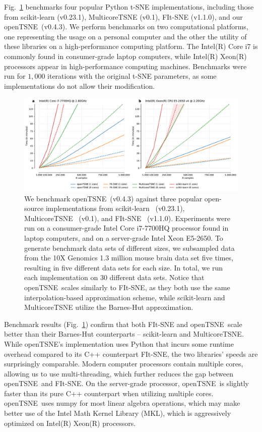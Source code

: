 \documentclass[letter]{article}
\newcommand{\opentsne}{\textsf{openTSNE}}
\begin{document}
Fig.~\ref{fig:benchmarks} benchmarks four popular Python t-SNE implementations,
including those from \textsf{scikit-learn} (v0.23.1), \textsf{MulticoreTSNE}
(v0.1), \textsf{FIt-SNE} (v1.1.0), and our \opentsne\ (v0.4.3). We perform
benchmarks on two computational platforms, one representing the usage on a
personal computer and the other the utility of these libraries on a high-performance
computing platform. The Intel(R) Core i7 is commonly found in consumer-grade
laptop computers, while Intel(R) Xeon(R) processors appear in high-performance
computing machines. Benchmarks were run for $1,000$ iterations with the original
t-SNE parameters, as some implementations do not allow their modification. 

\begin{figure}[htbp]
  \includegraphics[width=\textwidth]{benchmarks}
  \caption{\label{fig:benchmarks}
  We benchmark \opentsne\ (v0.4.3) against three popular open-source implementations
	from \textsf{scikit-learn}~\cite{pedregosa2011scikit} (v0.23.1),
	\textsf{MulticoreTSNE}~\cite{Ulyanov2016} (v0.1), and
	\textsf{FIt-SNE}~\cite{linderman2019fast} (v1.1.0). Experiments were run on a
	consumer-grade Intel Core i7-7700HQ processor found in laptop computers,
	and on a server-grade Intel Xeon E5-2650. To generate benchmark data
	sets of different sizes, we subsampled data from the 10X Genomics 1.3
	million mouse brain data set five times, resulting in five different
	data sets for each size. In total, we run each implementation on 30
	different data sets. Notice that \opentsne\ scales similarly to \textsf{FIt-SNE},
	as they both use the same interpolation-based approximation scheme,
	while \textsf{scikit-learn} and \textsf{MulticoreTSNE} utilize the Barnes-Hut
	approximation.
}
\end{figure}

Benchmark results (Fig.~\ref{fig:benchmarks}) confirm that both \textsf{FIt-SNE}
and \opentsne\ scale better than their Barnes-Hut counterparts --
\textsf{scikit-learn} and \textsf{MulticoreTSNE}. While \opentsne's
implementation uses Python that incurs some runtime overhead compared to its C++
counterpart \textsf{FIt-SNE}, the two libraries' speeds are surprisingly
comparable. Modern computer processors contain multiple cores, allowing us to
use multi-threading, which further reduces the gap between \opentsne\ and
\textsf{FIt-SNE}. On the server-grade processor, \opentsne\ is slightly faster
than its pure C++ counterpart when utilizing multiple cores. \opentsne\ uses
\textsf{numpy} for most linear algebra operations, which may make better use of
the Intel Math Kernel Library (MKL), which is aggressively optimized on Intel(R)
Xeon(R) processors.  
\end{document}
